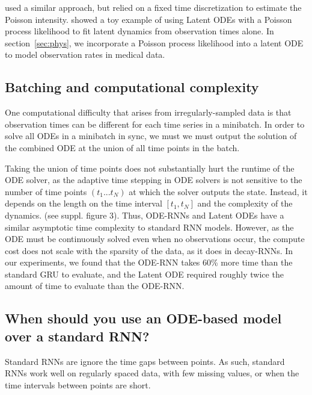 \documentclass{article}
\begin{document}
\citet{neural_hawkes} used a similar approach, but relied on a fixed time discretization to estimate the Poisson intensity. 
\citet{NeuralODE} showed a toy example of using Latent ODEs with a Poisson process likelihood to fit latent dynamics from observation times alone.
In section~\ref{sec:phys}, we incorporate a Poisson process likelihood into a latent ODE to model observation rates in medical data.




\subsection{Batching and computational complexity}
One computational difficulty that arises from irregularly-sampled data is that observation times can be different for each time series in a minibatch.
In order to solve all ODEs in a minibatch in sync, we must we must output the solution of the combined ODE at the union of all time points in the batch.


Taking the union of time points does not substantially hurt the runtime of the ODE solver, as the adaptive time stepping in ODE solvers is not sensitive to the number of time points $(t_1 ... t_N)$ at which the solver outputs the state.
Instead, it depends on the length on the time interval $[t_1, t_N]$ and the complexity of the dynamics. (see suppl. figure 3).
Thus, ODE-RNNs and Latent ODEs have a similar asymptotic time complexity to standard RNN models. However, as the ODE must be continuously solved even when no observations occur, the compute cost does not scale with the sparsity of the data, as it does in decay-RNNs.
In our experiments, we found that the ODE-RNN takes 60\% more time than the standard GRU to evaluate, and the Latent ODE required roughly twice the amount of time to evaluate than the ODE-RNN.












\subsection{When should you use an ODE-based model over a standard RNN?}



Standard RNNs are ignore the time gaps between points.
As such, standard RNNs work well on regularly spaced data, with few missing values, or when the time intervals between points are short.
\end{document}
